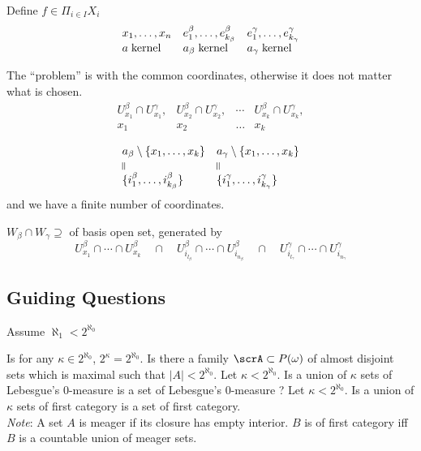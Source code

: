 \documentclass[11pt,pdftex,twoside,a4paper]{article}
\theoremstyle{definition}
\begin{document}
Define \(f\in \Pi_{i\in I} X_i\)
\begin{equation*}
\begin{array}{lll}
x_1,\ldots,x_n & 
  e_1^\beta,\ldots,e_{k_\beta}^\beta & e_1^\gamma,\ldots,e_{k_\gamma}^\gamma
\\
a\;\textnormal{kernel} & 
  a_\beta\; \textnormal{kernel} & a_\gamma\;\textnormal{kernel} 
\end{array}
\end{equation*}

The ``problem'' is with the common coordinates, otherwise
it does not matter what is chosen.
\begin{equation*}
 \begin{array}{llll}
 U_{x_1}^\beta \cap U_{x_1}^\gamma, &
 U_{x_2}^\beta \cap U_{x_2}^\gamma, &
 \cdots &
 U_{x_k}^\beta \cap U_{x_k}^\gamma, \\
 x_1 & x_2 & \ldots & x_k
 \end{array}
\end{equation*}

\begin{equation*}
\begin{array}{ll}
a_\beta \setminus\{x_1,\ldots,x_k\}  & a_\gamma \setminus\{x_1,\ldots,x_k\} \\
\rotatebox[origin=c]{90}{\(=\)} & \rotatebox[origin=c]{90}{\(=\)} \\
\{i_1^\beta, \ldots, i_{k_\beta}^\beta\} & \{i_1^\gamma, \ldots, i_{k_\gamma}^\gamma \}
\end{array}
\end{equation*}
and we have a finite number of coordinates.

\(W_\beta \cap W_\gamma \supseteq\)  of basis open set, generated by
\begin{equation*}
U_{x_1}^\beta \cap \cdots \cap U_{x_k}^\beta 
  \quad \cap \quad 
  U_{i_{l_\beta}}^\beta \cap \cdots \cap  U_{i_{n_\beta}}^\beta
  \quad \cap \quad 
  U_{i_{l_\gamma}}^\gamma \cap \cdots \cap  U_{i_{n_\gamma}}^\gamma
\end{equation*}

\subsection{Guiding Questions}

Assume \(\aleph_1 < 2^{\aleph_0}\)
\begin{itemize}
 Is for any \(\kappa \in 2^{\aleph_0}\), \(2^\kappa = 2^{\aleph_0}\).
 Is there a family \(\scrA \subset P(\omega)\)
of almost disjoint sets which is maximal such that \(|A| < 2^{\aleph_0}\).
 Let \(\kappa < 2^{\aleph_0}\). Is a union of \(\kappa\)
sets of Lebesgue's $0$-measure is a set of Lebesgue's $0$-measure ?
 Let \(\kappa < 2^{\aleph_0}\). 
Is a union of \(\kappa\) sets of first category is a set of first category.
\\
\emph{Note}: A set $A$ is meager if its closure has empty interior.
$B$ is of first category iff $B$ is a countable union of meager sets.
\end{itemize}
\end{document}
